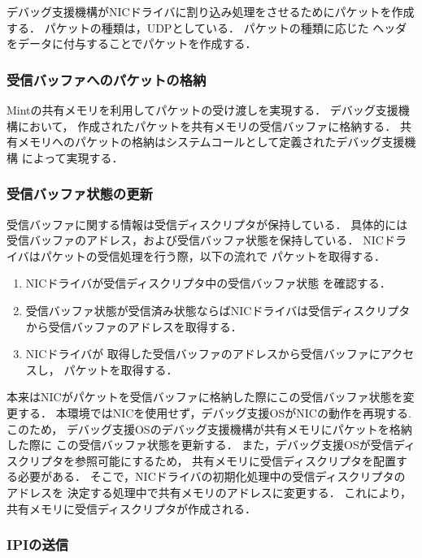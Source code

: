 \documentclass[submit,techreq,noauthor,dvipdfmx]{ipsj}
\begin{document}
デバッグ支援機構がNICドライバに割り込み処理をさせるためにパケットを作成する．
パケットの種類は，UDPとしている．
パケットの種類に応じた
ヘッダをデータに付与することでパケットを作成する．

\subsubsection*{受信バッファへのパケットの格納}\label{sec:store_packet_to_recieving_buffer}

Mintの共有メモリを利用してパケットの受け渡しを実現する．
デバッグ支援機構において，
作成されたパケットを共有メモリの受信バッファに格納する．
共有メモリへのパケットの格納はシステムコールとして定義されたデバッグ支援機構
によって実現する．

\subsubsection*{受信バッファ状態の更新}\label{sec:renew_recieving_descripter}

受信バッファに関する情報は受信ディスクリプタが保持している．
具体的には受信バッファのアドレス，および受信バッファ状態を保持している．
NICドライバはパケットの受信処理を行う際，以下の流れで
パケットを取得する．

\begin{enumerate}
    \item 
        NICドライバが受信ディスクリプタ中の受信バッファ状態
        を確認する．
    \item
        受信バッファ状態が受信済み状態ならばNICドライバは受信ディスクリプタ
        から受信バッファのアドレスを取得する．
    \item
        NICドライバが
        取得した受信バッファのアドレスから受信バッファにアクセスし，
        パケットを取得する．
\end{enumerate}
本来はNICがパケットを受信バッファに格納した際にこの受信バッファ状態を変更する．
本環境ではNICを使用せず，デバッグ支援OSがNICの動作を再現する.
このため，
デバッグ支援OSのデバッグ支援機構が共有メモリにパケットを格納した際に
この受信バッファ状態を更新する．
また，デバッグ支援OSが受信ディスクリプタを参照可能にするため，
共有メモリに受信ディスクリプタを配置する必要がある．
そこで，NICドライバの初期化処理中の受信ディスクリプタのアドレスを
決定する処理中で共有メモリのアドレスに変更する．
これにより，共有メモリに受信ディスクリプタが作成される．

\subsubsection*{IPIの送信}\label{sec:send_IPI}
\end{document}
